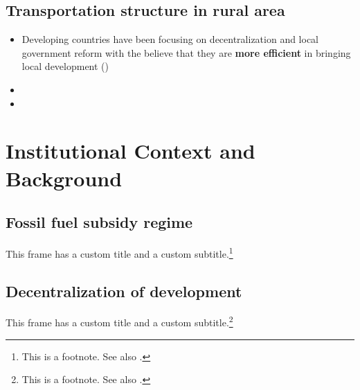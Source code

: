 \documentclass[
11pt,notheorems,hyperref={pdfauthor=Maghfira Ramadhani}
]{beamer}
\begin{document}
\subsection{Transportation structure in rural area}
\begin{frame}
\begin{itemize}
    \item Developing countries have been focusing on decentralization and local government reform with the believe that they are \alert{\textbf{more efficient}} in bringing local development (\cite{vazquez_2017}) 
    \item 
    \item 
\end{itemize}
\end{frame}

\section{Institutional Context and Background}
\subsection{Fossil fuel subsidy regime}
\begin{frame}
    This frame has a custom title and a custom subtitle.\footnote{This is a footnote. See also \textcite{hartojo_2022}. }
\end{frame}

\subsection{Decentralization of development}
\begin{frame}
    This frame has a custom title and a custom subtitle.\footnote{This is a footnote. See also \textcite{hartojo_2022}. }
\end{frame}
\end{document}
